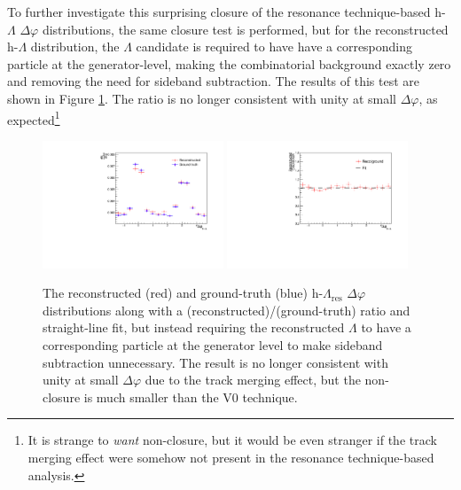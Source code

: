 To further investigate this surprising closure of the resonance technique-based h-$\Lambda$ $\Delta\varphi$ distributions, the same closure test is performed, but for the reconstructed h-$\Lambda$ distribution, the $\Lambda$ candidate is required to have have a corresponding particle at the generator-level, making the combinatorial background exactly zero and removing the need for sideband subtraction. The results of this test are shown in Figure \ref{fig:h_lambda_mc_closure_res_no_sideband}. The ratio is no longer consistent with unity at small $\Delta\varphi$, as expected\footnote{It is strange to \textit{want} non-closure, but it would be even stranger if the track merging effect were somehow not present in the resonance technique-based analysis.}

\begin{figure}[ht]
    \centering
    \includegraphics[width=0.48\textwidth]{figures/analysis/h_lambda_mc_closure_res_no_sideband.pdf}
    \includegraphics[width=0.48\textwidth]{figures/analysis/h_lambda_mc_closure_ratio_res_no_sideband.pdf}
    \caption{The reconstructed (red) and ground-truth (blue) h-$\Lambda_{\text{res}}$ $\Delta\varphi$ distributions along with a (reconstructed)/(ground-truth) ratio and straight-line fit, but instead requiring the reconstructed $\Lambda$ to have a corresponding particle at the generator level to make sideband subtraction unnecessary.  The result is no longer consistent with unity at small $\Delta\varphi$ due to the track merging effect, but the non-closure is much smaller than the V0 technique.}
    \label{fig:h_lambda_mc_closure_res_no_sideband}
\end{figure}


